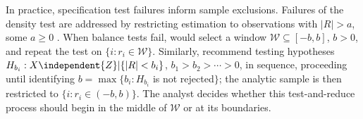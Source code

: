 In practice, specification test failures inform sample exclusions.
Failures of the density test are addressed by restricting
estimation to observations with $|R|>a$, some $a \geq 0$
\citep[e.g.,][]{barrecaetal2011birthweightRDD,eggers2014validity}.
When balance tests fail,
\citet{lee2010regression} would select a window
$\mathcal{W} \subseteq [-b, b]$, $b>0$, %
and repeat the test on $\{i : r_{i} \in \mathcal{W}\}$. Similarly,
\citet{cattaneo2014randomization} recommend testing hypotheses
$H_{b_{i}}: {X} \independent {Z}| \{|R| < b_{i}\}$, $b_1 > b_2 > \cdots >0$, in sequence,
proceeding until identifying  $b = \max \{ b_i: H_{b_{i}}$ is not rejected$\}$;
the analytic sample is then restricted to  $\{i: r_{i} \in (-b,b)\}$.
The analyst decides whether this test-and-reduce process
should begin in the middle of $\mathcal{W}$ or at its boundaries.






